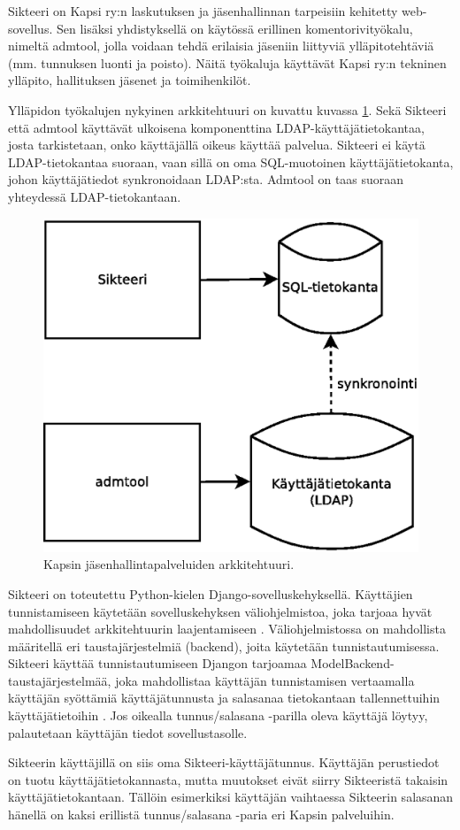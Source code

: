 Sikteeri on Kapsi ry:n laskutuksen ja jäsenhallinnan tarpeisiin kehitetty web-sovellus. Sen lisäksi yhdistyksellä on käytössä erillinen komentorivityökalu, nimeltä admtool, jolla voidaan tehdä erilaisia jäseniin liittyviä ylläpitotehtäviä (mm. tunnuksen luonti ja poisto). Näitä työkaluja käyttävät Kapsi ry:n tekninen ylläpito, hallituksen jäsenet ja toimihenkilöt.

Ylläpidon työkalujen nykyinen arkkitehtuuri on kuvattu kuvassa \ref{kapsi_nykyinen}. Sekä Sikteeri että admtool käyttävät ulkoisena komponenttina LDAP-käyt\-tä\-jä\-tie\-to\-kan\-taa, josta tarkistetaan, onko käyttäjällä oikeus käyttää palvelua. Sikteeri ei käytä LDAP-tietokantaa suoraan, vaan sillä on oma SQL-muotoinen käyttäjätietokanta, johon käyttäjätiedot synkronoidaan LDAP:sta. Admtool on taas suoraan yhteydessä LDAP-tietokantaan.

\begin{figure}[!b]
\centering
\includegraphics[width=.7\textwidth]{toteutus/kapsi_nykyinen.eps}
\caption{Kapsin jäsenhallintapalveluiden arkkitehtuuri.}%
\label{kapsi_nykyinen}
\end{figure}

Sikteeri on toteutettu Python-kielen Django-so\-vel\-lus\-ke\-hyk\-sel\-lä. Käyttäjien tunnistamiseen käytetään sovelluskehyksen vä\-li\-oh\-jel\-mis\-to\-a, joka tarjoaa hyvät mahdollisuudet arkkitehtuurin laajentamiseen \cite{django_auth}. Väliohjelmistossa on mahdollista määritellä eri taustajärjestelmiä (backend), joita käytetään tunnistautumisessa. Sikteeri käyttää tunnistautumiseen Djangon tarjoamaa ModelBackend-taus\-ta\-jär\-jes\-tel\-mää, joka mahdollistaa käyttäjän tunnistamisen vertaamalla käyttäjän syöttämiä käyttäjätunnusta ja salasanaa tietokantaan tallennettuihin käyttäjätietoihin \cite{django_auth}. Jos oikealla tunnus/salasana -parilla oleva käyttäjä löytyy, palautetaan käyttäjän tiedot sovellustasolle.

Sikteerin käyttäjillä on siis oma Sikteeri-käyttäjätunnus. Käyttäjän perustiedot on tuotu käyttäjätietokannasta, mutta muutokset eivät siirry Sikteeristä takaisin käyttäjätietokantaan. Tällöin esimerkiksi käyttäjän vaihtaessa Sikteerin salasanan hänellä on kaksi erillistä tunnus/salasana -paria eri Kapsin palveluihin.